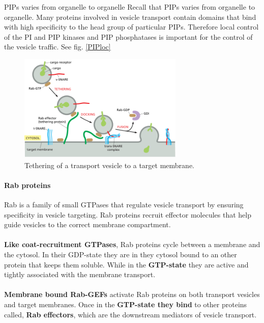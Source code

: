 \documentclass[../main.tex]{subfiles}
\begin{document}
\begin{RemarkWithTitel}{PIPs varies from organelle to organelle}
	Recall that PIPs varies from organelle to organelle. Many proteins involved in vesicle transport contain domains that bind with high specificity to the head group of particular PIPs. Therefore local control of the PI and PIP kinases and PIP phosphatases is important for the control of the vesicle traffic. See fig. \ref{PIPloc} 
\end{RemarkWithTitel}

\begin{figure}[H]
	\centering
	\includegraphics[width=0.7\textwidth]{13}
	\caption{Tethering of a transport vesicle to a target membrane.}
\end{figure}


\paragraph{Rab proteins}

\gls{Rab} is a family of small GTPases that regulate vesicle transport by ensuring specificity in vesicle targeting. Rab proteins recruit effector molecules that help guide vesicles to the correct membrane compartment. \\
\\
\textbf{Like coat-recruitment GTPases}, Rab proteins cycle between a membrane and the cytosol. In their GDP-state they are in they cytosol bound to an other protein that keeps them soluble. While in the \textbf{GTP-state} they are active and tightly associated with the membrane transport. \\
\\
\textbf{Membrane bound Rab-GEFs} activate Rab proteins on both transport vesicles and target membranes. Once in the \textbf{GTP-state they bind} to other proteins called, \textbf{Rab effectors}, which are the downstream mediators of vesicle transport. 
\end{document}
